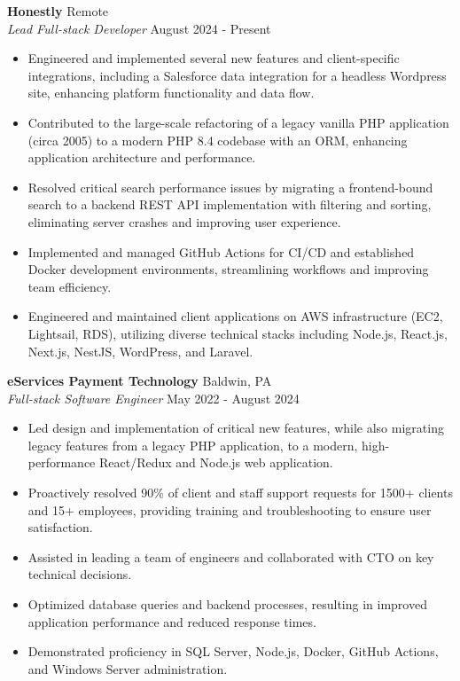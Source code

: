 \documentclass[letterpaper]{article}
\begin{document}
\textbf{Honestly} \hfill Remote\\
\textit{Lead Full-stack Developer} \hfill August 2024 - Present\\
\vspace{-1mm}
\begin{itemize} \itemsep -1pt
    \item Engineered and implemented several new features and client-specific integrations, including a Salesforce data integration for a headless Wordpress site, enhancing platform functionality and data flow.
    \item Contributed to the large-scale refactoring of a legacy vanilla PHP application (circa 2005) to a modern PHP 8.4 codebase with an ORM, enhancing application architecture and performance.
    \item Resolved critical search performance issues by migrating a frontend-bound search to a backend REST API implementation with filtering and sorting, eliminating server crashes and improving user experience.
    \item Implemented and managed GitHub Actions for CI/CD and established Docker development environments, streamlining workflows and improving team efficiency.
    \item Engineered and maintained client applications on AWS infrastructure (EC2, Lightsail, RDS), utilizing diverse technical stacks including Node.js, React.js, Next.js, NestJS, WordPress, and Laravel.
\end{itemize}
\vspace{-1mm}
\textbf{eServices Payment Technology} \hfill Baldwin, PA\\
\textit{Full-stack Software Engineer} \hfill May 2022 - August 2024\\
\vspace{-1mm}
\begin{itemize} \itemsep -1pt
    \item Led design and implementation of critical new features, while also migrating legacy features from a legacy PHP application, to a modern, high-performance React/Redux and Node.js web application.
    \item Proactively resolved 90\% of client and staff support requests for 1500+ clients and 15+ employees, providing training and troubleshooting to ensure user satisfaction.
    \item Assisted in leading a team of engineers and collaborated with CTO on key technical decisions.
    \item Optimized database queries and backend processes, resulting in improved application performance and reduced response times.
    \item Demonstrated proficiency in SQL Server, Node.js, Docker, GitHub Actions, and Windows Server administration.
\end{itemize}
\end{document}
